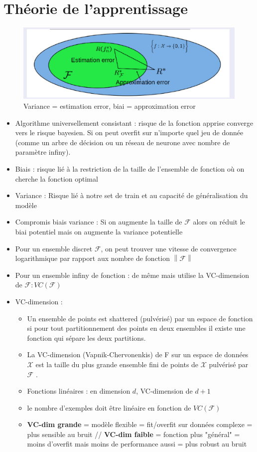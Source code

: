 \documentclass{article}
\theoremstyle{plain}%
\theoremstyle{definition}
\theoremstyle{remark}
\begin{document}
\section{Théorie de l'apprentissage}
\begin{figure}[!htbp]
    \centering
    \includegraphics*[width=.65\textwidth]{biais-variance.png}
    \caption{Variance = estimation error, biai = approximation error}
    \label{<label>}
\end{figure}
\begin{itemize}
    \item Algorithme universellement consistant : risque de la fonction apprise converge vers le risque bayesien. Si on peut overfit sur n'importe quel jeu de donnée (comme un arbre de décision ou un réseau de neurone avec nombre de paramètre infiny).
    \item Biais : risque lié à la restriction de la taille de l'ensemble de fonction où on cherche la fonction optimal
    \item Variance : Risque lié à notre set de train et au capacité de généralisation du modèle
    \item Compromis biais variance : Si on augmente la taille de $\mathcal{F}$ alors on réduit le biai potentiel mais on augmente la variance potentielle
    \item Pour un ensemble discret $ \mathcal{F} $, on peut trouver une vitesse de convergence logarithmique par rapport aux nombre de fonction $ \left\| \mathcal{F} \right\|  $ 
    \item Pour un ensemble infiny de fonction : de même mais utilise la VC-dimension de $ \mathcal{F} : VC(\mathcal{F}) $ 
    \item VC-dimension : \begin{itemize}
        \item Un ensemble de points est shattered (pulvérisé) par un espace de fonction si pour tout partitionnement des points en deux ensembles il existe une fonction qui sépare les deux partitions.
        \item La VC-dimension (Vapnik-Chervonenkis) de F sur un espace de données $ \mathcal{X} $  est la taille du plus grande ensemble fini de points de $ \mathcal{X} $  pulvérisé par $ \mathcal{F} $ .
        \item Fonctions linéaires : en dimension $ d $, VC-dimension de $ d + 1 $
        \item le nombre d'exemples doit être linéaire en fonction de $ VC(\mathcal{F}) $ 
        \item \textbf{VC-dim grande} = modèle flexible = fit/overfit sur données complexe = plus sensible au bruit // \textbf{VC-dim faible} = fonction plus "général" = moins d'overfit mais moins de performance aussi = plus robust au bruit 
    \end{itemize}
\end{itemize}
\end{document}
